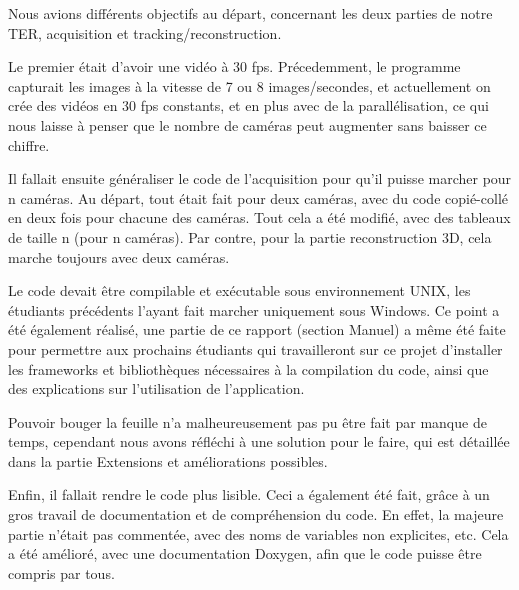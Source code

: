 Nous avions différents objectifs au départ, concernant les deux parties de notre TER, acquisition et tracking/reconstruction.

Le premier était d'avoir une vidéo à 30 fps. Précedemment, le programme capturait les images à la vitesse de 7 ou 8 images/secondes, et actuellement on crée des vidéos en 30 fps constants, et en plus avec de la parallélisation, ce qui nous laisse à penser que le nombre de caméras peut augmenter sans baisser ce chiffre.

Il fallait ensuite généraliser le code de l'acquisition pour qu'il puisse marcher pour n caméras. Au départ, tout était fait pour deux caméras, avec du code copié-collé en deux fois pour chacune des caméras. Tout cela a été modifié, avec des tableaux de taille n (pour n caméras). Par contre, pour la partie reconstruction 3D, cela marche toujours avec deux caméras.

Le code devait être compilable et exécutable sous environnement UNIX, les étudiants précédents l'ayant fait marcher uniquement sous Windows. Ce point a été également réalisé, une partie de ce rapport (section Manuel) a même été faite pour permettre aux prochains étudiants qui travailleront sur ce projet d'installer les frameworks et bibliothèques nécessaires à la compilation du code, ainsi que des explications sur l'utilisation de l'application.

Pouvoir bouger la feuille n'a malheureusement pas pu être fait par manque de temps, cependant nous avons réfléchi à une solution pour le faire, qui est détaillée dans la partie Extensions et améliorations possibles.

Enfin, il fallait rendre le code plus lisible. Ceci a également été fait, grâce à un gros travail de documentation et de compréhension du code. En effet, la majeure partie n'était pas commentée, avec des noms de variables non explicites, etc. Cela a été amélioré, avec une documentation Doxygen, afin que le code puisse être compris par tous.